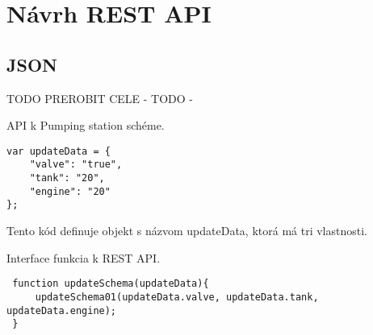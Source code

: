 \chapter{Návrh \acs{REST} \acs{API}}



\section{\acs{JSON}}



TODO PREROBIT CELE - TODO - 












%
%



API k Pumping station schéme. 

\begin{lstlisting}
var updateData = {
	"valve": "true",
	"tank": "20",
	"engine": "20"
};
\end{lstlisting}

Tento kód definuje objekt s názvom updateData, ktorá má tri vlastnosti. 




 Interface funkcia k REST API. 
 
 \begin{lstlisting}
 function updateSchema(updateData){
	 updateSchema01(updateData.valve, updateData.tank, updateData.engine);
 }
 \end{lstlisting}

